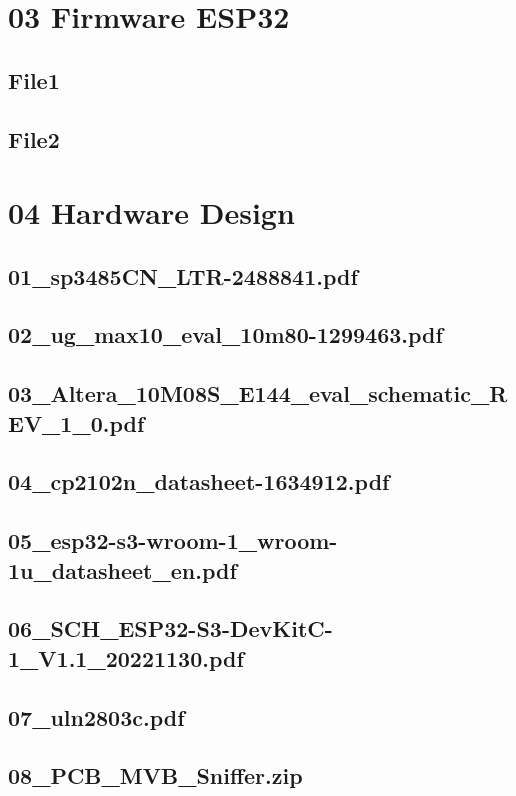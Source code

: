 \section{03 Firmware ESP32}
\label{app:Odner4}
\subsection{File1}
\label{app:File41}
\subsection{File2}
\label{app:File42}

\section{04 Hardware Design}
\label{app:Odner5}
\subsection{01\_sp3485CN\_LTR-2488841.pdf}
\label{app:File51}
\subsection{02\_ug\_max10\_eval\_10m80-1299463.pdf}
\label{app:File52}
\subsection{03\_Altera\_10M08S\_E144\_eval\_schematic\_REV\_1\_0.pdf}
\label{app:File53}
\subsection{04\_cp2102n\_datasheet-1634912.pdf}
\label{app:File54}
\subsection{05\_esp32-s3-wroom-1\_wroom-1u\_datasheet\_en.pdf}
\label{app:File55}
\subsection{06\_SCH\_ESP32-S3-DevKitC-1\_V1.1\_20221130.pdf}
\label{app:File56}
\subsection{07\_uln2803c.pdf}
\label{app:File57}
\subsection{08_PCB_MVB_Sniffer.zip}
\label{app:File58}

